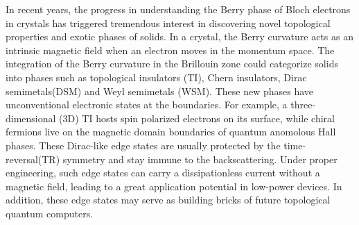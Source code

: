 %
%
%
%
%
%
%

In recent years, the progress in understanding the Berry phase of Bloch electrons in crystals has triggered tremendous interest in discovering  novel topological properties and exotic phases of solids. In a crystal, the Berry curvature acts as an intrinsic magnetic field when an electron moves in the momentum space. The integration of  the Berry curvature in the Brillouin zone could categorize solids into phases such as topological insulators (TI), Chern insulators, Dirac semimetals(DSM) and Weyl semimetals (WSM). These new phases have unconventional electronic states at the boundaries. For example, a three-dimensional (3D) TI hosts spin polarized electrons on its surface, while chiral fermions live on the magnetic domain boundaries of quantum anomolous Hall phases. These Dirac-like edge states are usually protected by the time-reversal(TR) symmetry and stay immune to the backscattering. Under proper engineering, such edge states can carry a dissipationless current without a magnetic field, leading to a great application potential in low-power devices. In addition, these edge states may serve as building bricks of future topological quantum computers.

